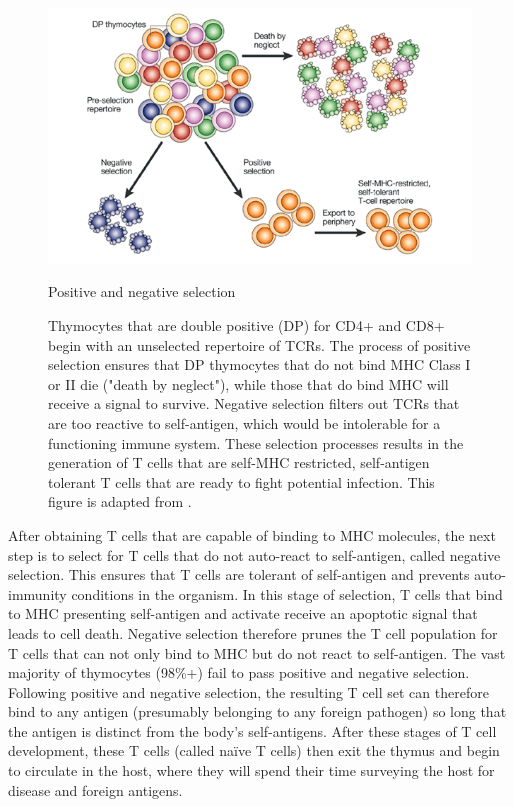 \begin{figure}[htbp]
	\centering
	\includegraphics[width=\textwidth]{../figures/chapter1/posnegsel.png}
	\caption{Positive and negative selection}
	\caption*{Thymocytes that are double positive (DP) for CD4+ and CD8+ begin with an unselected repertoire of TCRs. The process of positive selection ensures that DP thymocytes that do not bind MHC Class I or II die ("death by neglect"), while those that do bind MHC will receive a signal to survive. Negative selection filters out TCRs that are too reactive to self-antigen, which would be intolerable for a functioning immune system.  These selection processes results in the generation of T cells that are self-MHC restricted, self-antigen tolerant T cells that are ready to fight potential infection. This figure is adapted from \cite{Palmer2003}.}
	\label{fig:posnegsel}
\end{figure}

After obtaining T cells that are capable of binding to MHC molecules, the next step is to select for T cells that do not auto-react to self-antigen, called negative selection. This ensures that T cells are tolerant of self-antigen and prevents auto-immunity conditions in the organism. In this stage of selection, T cells that bind to MHC presenting self-antigen and activate receive an apoptotic signal that leads to cell death. Negative selection therefore prunes the T cell population for T cells that can not only bind to MHC but do not react to self-antigen. The vast majority of thymocytes (98\%+) fail to pass positive and negative selection. Following positive and negative selection, the resulting T cell set can therefore bind to any antigen (presumably belonging to any foreign pathogen) so long that the antigen is distinct from the body’s self-antigens. 
After these stages of T cell development, these T cells (called naïve T cells) then exit the thymus and begin to circulate in the host, where they will spend their time surveying the host for disease and foreign antigens.

